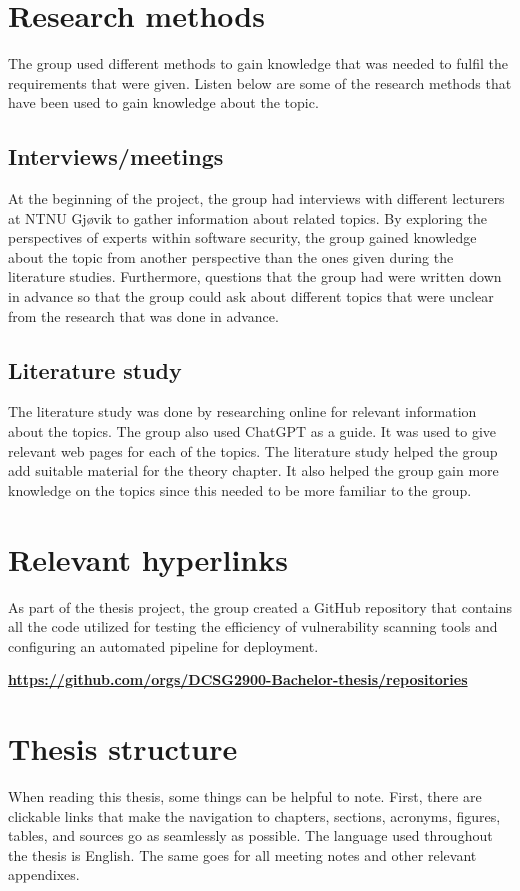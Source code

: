 \section{Research methods}
The group used different methods to gain knowledge that was needed to fulfil the requirements that were given. 
Listen below are some of the research methods that have been used to gain knowledge about the topic. 
\subsection{Interviews/meetings}
At the beginning of the project, the group had interviews with different lecturers at NTNU Gjøvik to gather information about related topics. By exploring the perspectives of experts within software security, the group gained knowledge about the topic from another perspective than the ones given during the literature studies. Furthermore, questions that the group had were written down in advance so that the group could ask about different topics that were unclear from the research that was done in advance.   

\subsection{Literature study}
The literature study was done by researching online for relevant information about the topics. The group also used ChatGPT as a guide. It was used to give relevant web pages for each of the topics. The literature study helped the group add suitable material for the theory chapter. It also helped the group gain more knowledge on the topics since this needed to be more familiar to the group. 

\section{Relevant hyperlinks}
As part of the thesis project, the group created a GitHub repository that contains all the code utilized for testing the efficiency of vulnerability scanning tools and configuring an automated pipeline for deployment. 

\href{https://github.com/orgs/DCSG2900-Bachelor-thesis/repositories}{\textbf{https://github.com/orgs/DCSG2900-Bachelor-thesis/repositories}}

\section{Thesis structure}
When reading this thesis, some things can be helpful to note. First, there are clickable links that make the navigation to chapters, sections, acronyms, figures, tables, and sources go as seamlessly as possible. The language used throughout the thesis is English. The same goes for all meeting notes and other relevant appendixes. 

